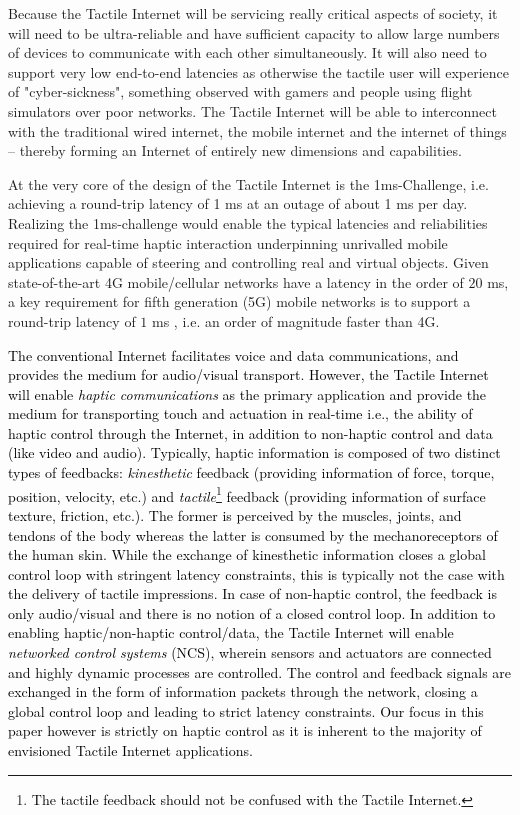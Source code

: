 \documentclass[journal]{IEEEtran}
\begin{document}
Because the Tactile Internet will be servicing really critical aspects of society, it will need to be ultra-reliable and have sufficient capacity to allow large numbers of devices to communicate with each other simultaneously. It will also need to support very low end-to-end latencies as otherwise the tactile user will experience of "cyber-sickness", something observed with gamers and people using flight simulators over poor networks. The Tactile Internet will be able to interconnect with the traditional wired internet, the mobile internet and the internet of things – thereby forming an Internet of entirely new dimensions and capabilities.




At the very core of the design of the Tactile Internet is the 1ms-Challenge, i.e. achieving a round-trip latency of 1 ms at an outage of about 1 ms per day. Realizing the 1ms-challenge would enable the typical latencies and reliabilities required for real-time haptic interaction underpinning unrivalled mobile applications capable of steering and controlling real and virtual objects. Given state-of-the-art 4G mobile/cellular networks have a latency in the order of $20$ ms, a key requirement for fifth generation (5G) mobile networks is to support a round-trip latency of  $1$ ms \cite{5G-GF,5G}, i.e. an order of magnitude faster than 4G.


\textcolor{black}{The conventional Internet facilitates voice and data communications, and provides the medium for audio/visual transport. However, the Tactile Internet will enable \emph{haptic communications} \cite{HC} as the primary application and provide the medium for transporting touch and actuation in real-time i.e., the ability of haptic control through the Internet, in addition to non-haptic control and data (like video and audio). Typically, haptic information is composed of two distinct types of feedbacks: \emph{kinesthetic} feedback (providing information of force, torque, position, velocity, etc.) and \emph{tactile}\footnote{\textcolor{black}{The tactile feedback should not be confused with the Tactile Internet.}} feedback (providing information of surface texture, friction, etc.). The former is perceived by the muscles, joints, and tendons of the body whereas the latter is consumed by the 	mechanoreceptors of the human skin. While the exchange of kinesthetic information closes a global control loop with stringent latency constraints, this is typically not the case with the delivery of tactile impressions. In case of non-haptic control, the feedback is only audio/visual and there is no notion of a closed control loop.  In addition to enabling haptic/non-haptic control/data, the Tactile Internet will enable \emph{networked control systems} (NCS), wherein sensors and actuators are connected and highly dynamic processes are controlled. The control and feedback signals are exchanged in the form of information packets through the network, closing a global control loop and leading to strict latency constraints. Our focus in this paper however is strictly on haptic control as it is inherent to the majority of envisioned Tactile Internet applications.  }
\end{document}
